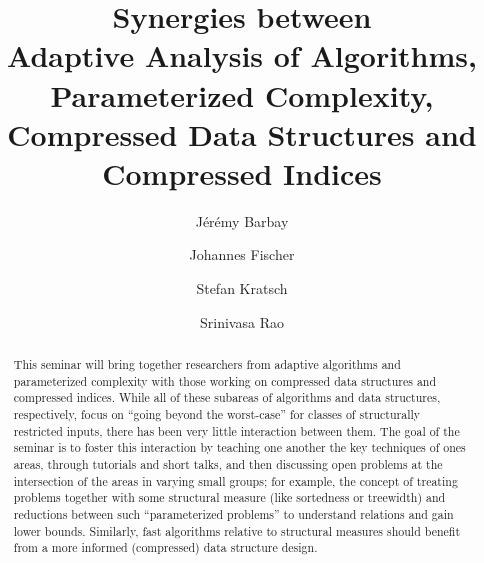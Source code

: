 \documentclass[a4paper,10pt]{article}
\begin{document}
\title{Synergies between \\ Adaptive Analysis of Algorithms, Parameterized Complexity, \\ Compressed Data Structures and Compressed Indices}


\author{J\'er\'emy Barbay \and Johannes Fischer \and Stefan Kratsch \and Srinivasa Rao }

\maketitle              %

\begin{abstract}
This seminar will bring together researchers from adaptive algorithms and parameterized complexity with those working on compressed data structures and compressed indices. While all of these subareas of algorithms and data structures, respectively, focus on ``going beyond the worst-case'' for classes of structurally restricted inputs, there has been very little interaction between them. The goal of the seminar is to foster this interaction by teaching one another the key techniques of ones areas, through tutorials and short talks, and then discussing open problems at the intersection of the areas in varying small groups; for example, the concept of treating problems together with some structural measure (like sortedness or treewidth) and reductions between such ``parameterized problems'' to understand relations and gain lower bounds. Similarly, fast algorithms relative to structural measures should benefit from a more informed (compressed) data structure design.
\end{abstract}

\end{document}
